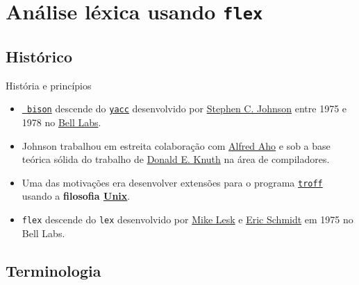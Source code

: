 \frame{\title{\insertlecture}\maketitle}

\section{Análise léxica usando {\tt flex}}

\frame{\tableofcontents}

\subsection{Histórico}

\begin{frame}{História e princípios}
  \begin{itemize}
  \item{\color{gray!70!black}\href{https://www.gnu.org/software/bison/}{\tt
      bison} descende do
    \href{(https://pt.wikipedia.org/wiki/Yacc}{\tt yacc} desenvolvido
    por
    \href{https://en.wikipedia.org/wiki/Stephen_C._Johnson}{Stephen
      C. Johnson} entre 1975 e 1978 no
    \href{https://pt.wikipedia.org/wiki/Bell_Labs}{Bell Labs}.}
  \item Johnson trabalhou em estreita colaboração com
    \href{https://en.wikipedia.org/wiki/Alfred_Aho}{Alfred Aho}
    e sob a base teórica sólida do trabalho de
    \href{https://www-cs-faculty.stanford.edu/~knuth/}{Donald E. Knuth}
    na área de compiladores.
  \item Uma das motivações era desenvolver extensões para o
    programa \href{https://en.wikipedia.org/wiki/Troff}{\tt troff}
    usando a {\bf filosofia
    \href{https://en.wikipedia.org/wiki/Unix_philosophy}{Unix}}.
  \item \alert{\tt flex} descende do \alert{\tt lex} desenvolvido por
    \href{https://en.wikipedia.org/wiki/Mike_Lesk}{Mike Lesk}
    e \href{https://en.wikipedia.org/wiki/Eric_Schmidt}{Eric Schmidt}
    em 1975 no Bell Labs.
  \end{itemize}
\end{frame}

\subsection{Terminologia}

